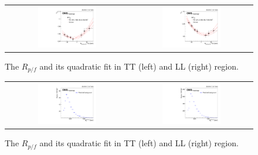 \begin{figure}[t]
  \centering
 \begin{tabular}{cc}
    \includegraphics[width=0.5\textwidth]{Figures/al/1d_TT.pdf} &
   \includegraphics[width=0.5\textwidth]{Figures/al/1d_LL.pdf} 
   
  \end{tabular}
  \caption{The $R_{p/f}$ and its quadratic fit in TT (left) and LL (right) region.}
  \label{fig:hvt_brs}
\end{figure}

\begin{figure}[t]
  \centering
 \begin{tabular}{cc}
    \includegraphics[width=0.5\textwidth]{Figures/al/mjj_TT.pdf} &
   \includegraphics[width=0.5\textwidth]{Figures/al/mjj_LL.pdf} 
   
  \end{tabular}
  \caption{The $R_{p/f}$ and its quadratic fit in TT (left) and LL (right) region.}
  \label{fig:hvt_brs}
\end{figure}

